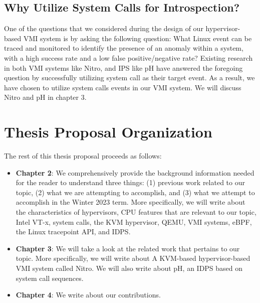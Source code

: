 \documentclass{report}
\begin{document}
\begin{spacing}{1.5}
\subsection{Why Utilize System Calls for Introspection?}

{\large
One of the questions that we considered during the design of our hypervisor-based VMI system is by asking the following question: What Linux event can be traced and monitored to identify the presence of an anomaly within a system, with a high success rate and a low false positive/negative rate? Existing research in both VMI systems like Nitro, and IPS like pH have answered the foregoing question by successfully utilizing system call as their target event. As a result, we have chosen to utilize system calls events in our VMI system. We will discuss Nitro and pH in chapter 3.
\newline
}


















\section{Thesis Proposal Organization}
{\large
The rest of this thesis proposal proceeds as follows:

\begin{itemize}
    \item \textbf{Chapter 2}: We comprehensively provide the background information needed for the reader to understand three things: (1) previous work related to our topic, (2) what we are attempting to accomplish, and (3) what we attempt to accomplish in the Winter 2023 term. More specifically, we will write about the characteristics of hypervisors, CPU features that are relevant to our topic, Intel VT-x, system calls, the KVM hypervisor, QEMU, VMI systems, eBPF, the Linux tracepoint API, and IDPS.

    \item \textbf{Chapter 3}: We will take a look at the related work that pertains to our topic. More specifically, we will write about A KVM-based hypervisor-based VMI system called Nitro. We will also write about pH, an IDPS based on system call sequences.

    \item \textbf{Chapter 4}: We write about our contributions.


\end{itemize}}
\end{spacing}
\end{document}
